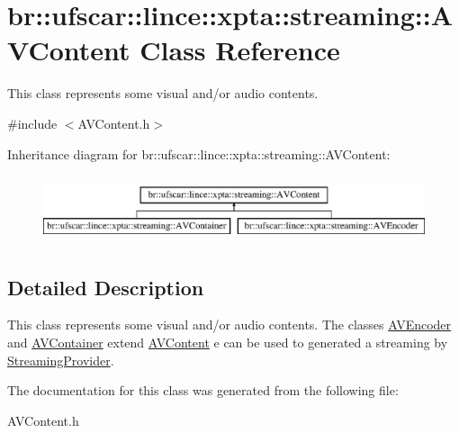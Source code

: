 \hypertarget{classbr_1_1ufscar_1_1lince_1_1xpta_1_1streaming_1_1AVContent}{
\section{br::ufscar::lince::xpta::streaming::AVContent Class Reference}
\label{classbr_1_1ufscar_1_1lince_1_1xpta_1_1streaming_1_1AVContent}
}


This class represents some visual and/or audio contents.  




{\ttfamily \#include $<$AVContent.h$>$}

Inheritance diagram for br::ufscar::lince::xpta::streaming::AVContent:\begin{figure}[H]
\begin{center}
\leavevmode
\includegraphics[height=2cm]{classbr_1_1ufscar_1_1lince_1_1xpta_1_1streaming_1_1AVContent}
\end{center}
\end{figure}


\subsection{Detailed Description}
This class represents some visual and/or audio contents. The classes \hyperlink{classbr_1_1ufscar_1_1lince_1_1xpta_1_1streaming_1_1AVEncoder}{AVEncoder} and \hyperlink{classbr_1_1ufscar_1_1lince_1_1xpta_1_1streaming_1_1AVContainer}{AVContainer} extend \hyperlink{classbr_1_1ufscar_1_1lince_1_1xpta_1_1streaming_1_1AVContent}{AVContent} e can be used to generated a streaming by \hyperlink{classbr_1_1ufscar_1_1lince_1_1xpta_1_1streaming_1_1StreamingProvider}{StreamingProvider}. 

The documentation for this class was generated from the following file:\begin{DoxyCompactItemize}
\item 
AVContent.h\end{DoxyCompactItemize}
